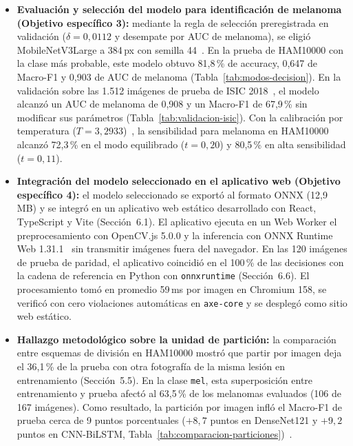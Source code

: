 \begin{itemize}
  \item \textbf{Evaluación y selección del modelo para identificación de melanoma (Objetivo específico 3):} mediante la regla de selección preregistrada en validación ($\delta = 0{,}0112$ y desempate por AUC de melanoma), se eligió MobileNetV3Large a 384\,px con semilla 44~\cite{howard2019mobilenetv3}. En la prueba de HAM10000 con la clase más probable, este modelo obtuvo 81,8\,\% de accuracy, 0,647 de Macro-F1 y 0,903 de AUC de melanoma (Tabla~\ref{tab:modos-decision}). En la validación sobre las 1.512 imágenes de prueba de ISIC 2018~\cite{codella2019isic2018}, el modelo alcanzó un AUC de melanoma de 0,908 y un Macro-F1 de 67,9\,\% sin modificar sus parámetros (Tabla~\ref{tab:validacion-isic}). Con la calibración por temperatura ($T = 3{,}2933$)~\cite{guo2017calibration}, la sensibilidad para melanoma en HAM10000 alcanzó 72,3\,\% en el modo equilibrado ($t = 0{,}20$) y 80,5\,\% en alta sensibilidad ($t = 0{,}11$).

  \item \textbf{Integración del modelo seleccionado en el aplicativo web (Objetivo específico 4):} el modelo seleccionado se exportó al formato ONNX (12,9\,MB) y se integró en un aplicativo web estático desarrollado con React, TypeScript y Vite (Sección~6.1). El aplicativo ejecuta en un Web Worker el preprocesamiento con OpenCV.js 5.0.0 y la inferencia con ONNX Runtime Web 1.31.1~\cite{ning2024onnxweb} sin transmitir imágenes fuera del navegador. En las 120 imágenes de prueba de paridad, el aplicativo coincidió en el 100\,\% de las decisiones con la cadena de referencia en Python con \texttt{onnxruntime} (Sección~6.6). El procesamiento tomó en promedio 59\,ms por imagen en Chromium 158, se verificó con cero violaciones automáticas en \texttt{axe-core} y se desplegó como sitio web estático.

  \item \textbf{Hallazgo metodológico sobre la unidad de partición:} la comparación entre esquemas de división en HAM10000 mostró que partir por imagen deja el 36,1\,\% de la prueba con otra fotografía de la misma lesión en entrenamiento (Sección~5.5). En la clase \texttt{mel}, esta superposición entre entrenamiento y prueba afectó al 63,5\,\% de los melanomas evaluados (106 de 167 imágenes). Como resultado, la partición por imagen infló el Macro-F1 de prueba cerca de 9 puntos porcentuales ($+8{,}7$ puntos en DenseNet121 y $+9{,}2$ puntos en CNN-BiLSTM, Tabla~\ref{tab:comparacion-particiones})~\cite{kapoor2023leakage,abhishek2025quality}.
\end{itemize}
